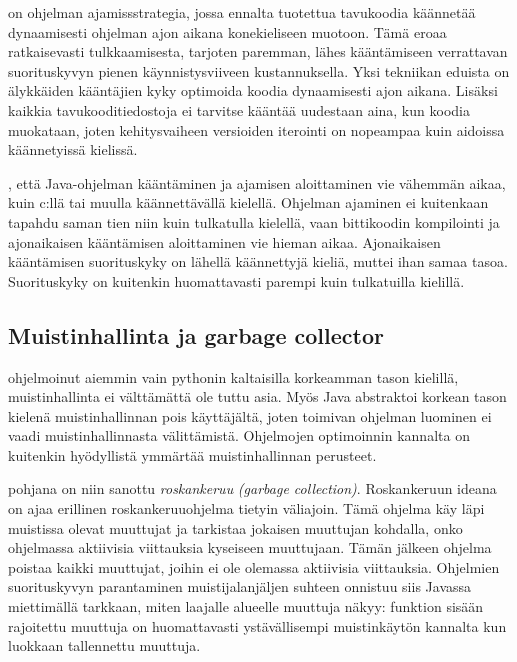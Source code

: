\documentclass{tufte-book}
\newcommand{\eng}[1]{\textit{(#1)}}
\newcommand{\new}[1]{\textit{\gls{#1}}}
\newcommand{\neweng}[2]{\new{#1} \eng{#2}}
\begin{document}
 on ohjelman ajamissstrategia, jossa ennalta tuotettua
tavukoodia käännetää dynaamisesti ohjelman ajon aikana konekieliseen muotoon. Tämä eroaa
ratkaisevasti tulkkaamisesta, tarjoten paremman, lähes kääntämiseen verrattavan suorituskyvyn
pienen käynnistysviiveen kustannuksella. Yksi tekniikan eduista on älykkäiden kääntäjien kyky
optimoida koodia dynaamisesti ajon aikana. Lisäksi kaikkia tavukooditiedostoja ei tarvitse kääntää
uudestaan aina, kun koodia muokataan, joten kehitysvaiheen versioiden iterointi on nopeampaa kuin
aidoissa käännetyissä kielissä.

, että Java-ohjelman kääntäminen ja ajamisen aloittaminen vie vähemmän
aikaa, kuin c:llä tai muulla käännettävällä kielellä. Ohjelman ajaminen ei kuitenkaan tapahdu
saman tien niin kuin tulkatulla kielellä, vaan bittikoodin kompilointi ja ajonaikaisen kääntämisen
aloittaminen vie hieman aikaa. Ajonaikaisen kääntämisen suorituskyky on lähellä käännettyjä
kieliä, muttei ihan samaa tasoa. Suorituskyky on kuitenkin huomattavasti parempi kuin tulkatuilla
kielillä.

\subsection{Muistinhallinta ja garbage collector}
\label{GC}

 ohjelmoinut aiemmin vain pythonin kaltaisilla korkeamman tason kielillä,
muistinhallinta ei välttämättä ole tuttu asia. Myös Java abstraktoi korkean tason kielenä
muistinhallinnan pois käyttäjältä, joten toimivan ohjelman luominen ei vaadi muistinhallinnasta
välittämistä. Ohjelmojen optimoinnin kannalta on kuitenkin hyödyllistä ymmärtää muistinhallinnan
perusteet.

 pohjana on niin sanottu
\neweng{roskankeruu}{garbage collection}. Roskankeruun ideana on ajaa erillinen roskankeruuohjelma
tietyin väliajoin. Tämä ohjelma käy läpi muistissa olevat muuttujat ja tarkistaa jokaisen
muuttujan kohdalla, onko ohjelmassa aktiivisia viittauksia kyseiseen muuttujaan. Tämän jälkeen
ohjelma poistaa kaikki muuttujat, joihin ei ole olemassa aktiivisia viittauksia. Ohjelmien
suorituskyvyn parantaminen muistijalanjäljen suhteen onnistuu siis Javassa miettimällä tarkkaan,
miten laajalle alueelle muuttuja näkyy: funktion sisään rajoitettu muuttuja on huomattavasti
ystävällisempi muistinkäytön kannalta kun luokkaan tallennettu muuttuja.
\end{document}
